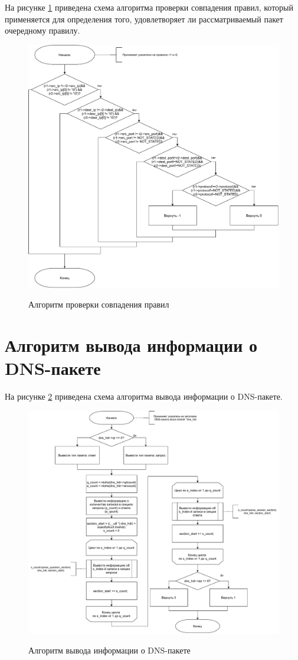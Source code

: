 На рисунке \ref{img:compare} приведена схема алгоритма проверки совпадения правил, который применяется для определения того, удовлетворяет ли рассматриваемый пакет очередному правилу.

\begin{figure}[h!]
	\begin{center}
		{\includegraphics[scale = 0.65]{inc/img/compare.pdf}}
		\caption{Алгоритм проверки совпадения правил}
		\label{img:compare}
	\end{center}
\end{figure}

\clearpage
\section{Алгоритм вывода информации о DNS-пакете}

На рисунке \ref{img:parse_dns} приведена схема алгоритма вывода информации о DNS-пакете.

\begin{figure}[h!]
	\begin{center}
		{\includegraphics[scale = 0.62]{inc/img/dns.pdf}}
		\caption{Алгоритм вывода информации о DNS-пакете}
		\label{img:parse_dns}
	\end{center}
\end{figure}


